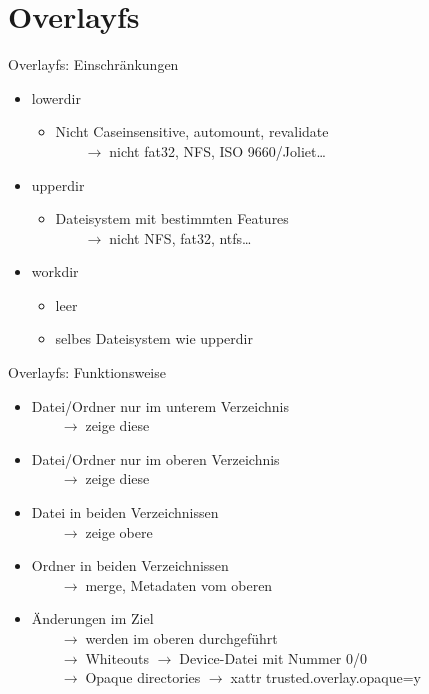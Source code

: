 \documentclass[11pt]{beamer}
\newcommand{\pfeil}{$\qquad\rightarrow\;$}
\newcommand{\pfeilk}{$\rightarrow\;$}
\begin{document}
\section{Overlayfs}
\begin{frame}{Overlayfs: Einschränkungen}
\begin{itemize}
\item lowerdir
  \begin{itemize}
  \item<2-> Nicht Caseinsensitive, automount, revalidate \\
    \pfeil nicht fat32, NFS, ISO 9660/Joliet…
  \end{itemize}
\pause\pause

\item upperdir
  \begin{itemize}
  \item Dateisystem mit bestimmten Features \\
   \pfeil nicht NFS, fat32, ntfs…
  \end{itemize}
\pause

\item workdir
  \begin{itemize}
  \item leer
  \item selbes Dateisystem wie upperdir
  \end{itemize}
\end{itemize}
  
\end{frame}


\begin{frame}{Overlayfs: Funktionsweise}
\begin{itemize}
 \item Datei/Ordner nur im unterem Verzeichnis \\ \pfeil zeige diese
 \item Datei/Ordner nur im oberen Verzeichnis \\ \pfeil  zeige diese
 \item Datei in beiden Verzeichnissen \\ \pfeil  zeige obere
 \item Ordner in beiden Verzeichnissen \\ \pfeil merge, Metadaten vom oberen
 \item Änderungen im Ziel \\ \pfeil werden im oberen durchgeführt
 \\ \pfeil Whiteouts \hfill\pfeilk Device-Datei mit Nummer 0/0 
 \\ \pfeil Opaque directories \hfill\pfeilk xattr trusted.overlay.opaque=y
\end{itemize}
\end{frame}
\end{document}
